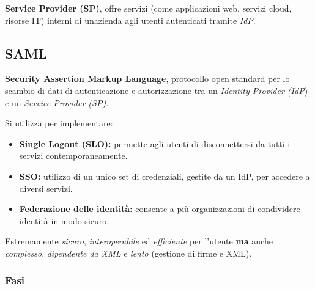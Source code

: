 \textbf{Service Provider (SP)}, offre servizi (come applicazioni web,
servizi cloud, risorse IT) interni di un\textquotesingle azienda agli
utenti autenticati tramite \emph{IdP}.

\subsection{SAML}\label{saml}

\textbf{Security Assertion Markup Language}, protocollo open standard
per lo scambio di dati di autenticazione e autorizzazione tra un
\emph{Identity Provider (IdP}) e un \emph{Service Provider (SP)}.

Si utilizza per implementare:

\begin{itemize}
\item
  \textbf{Single Logout (SLO):} permette agli utenti di disconnettersi
  da tutti i servizi contemporaneamente.
\item
  \textbf{SSO:} utilizzo di un unico set di credenziali, gestite da un
  IdP, per accedere a diversi servizi.
\item
  \textbf{Federazione delle identità:} consente a più organizzazioni di
  condividere identità in modo sicuro.
\end{itemize}

Estremamente \emph{sicuro}, \emph{interoperabile} ed \emph{efficiente}
per l'utente \textbf{ma} anche \emph{complesso}, \emph{dipendente da
XML} e \emph{lento} (gestione di firme e XML).

\subsubsection{Fasi}\label{fasi}


